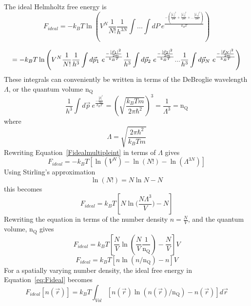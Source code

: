 \documentclass[double,12pt]{beavtex}
\begin{document}
The ideal Helmholtz free energy is
\begin{displaymath}{F_{ideal}=-k_BT\ln{\left(V^N\frac{1}{N!}\frac{1}{h^{3N}}\int{...}\int{dP}~e^\frac{-(\frac{|\vec{p}_1|^2}{2m}+ \frac{|\vec{p}_2|^2}{2m}+...\frac{|\vec{p}_N|^2}{2m})}{k_BT}\right)}}\end{displaymath}  

\begin{equation}{\label{Fidealmultipleint}}{=-k_BT\ln\left(V^N\frac{1}{N!}\frac{1}{h^{3}}\int{d\vec{p}_1}~e^\frac{-\frac{|\vec{p}_1|^2}{2m}}{k_BT}\frac{1}{h^{3}}\int{d\vec{p}_2}~e^\frac{-\frac{|\vec{p}_2|^2}{2m}}{k_BT}{...}\frac{1}{h^{3}}\int{d\vec{p}_N}~e^\frac{-\frac{|\vec{p}_N|^2}{2m}}{k_BT}\right)}\end{equation}
These integrals can conveniently be written in terms of the DeBroglie 
wavelength $\Lambda$, or the quantum volume $\text{n}_\text{Q}$
\begin{equation}{\frac{1}{h^{3}}\int{d\vec{p}}~e^\frac{-\frac{|\vec{p}|^2}{2m}}{k_BT}=\left(\sqrt{\frac{k_BTm}{2\pi\hbar^2}}\right)^3=\frac{1}{\Lambda^{3}}}=\text{n}_\text{Q}\end{equation} 
where \begin{equation}{\Lambda =\sqrt{\frac{2\pi\hbar^2}{k_BTm}}}\end{equation} 
Rewriting Equation~\ref{Fidealmultipleint} in terms of $\Lambda$ gives
\begin{equation}{F_{ideal}= -k_BT[\ln(V^N)-\ln(N!) - \ln(\Lambda^{3N})]}\end{equation}
Using Stirling's approximation \begin{equation}{\ln(N!)=N\ln{N}-N}\end{equation} 
this becomes
\begin{equation}{F_{ideal}= k_BT[N\ln(\frac{N\Lambda^{3}}{V}{)-N}]}\end{equation} 
Rewriting the equation in terms of the number density $n=\frac{N}{V}$, 
and the quantum volume, $\text{n}_\text{Q}$ gives
\begin{equation}{F_{ideal}= k_BT\left[\frac{N}{V}\ln{\left(\frac{N}{V}\frac{1}{\text{n}_\text{Q}}\right)}-\frac{N}{V}\right]}V\end{equation}
\begin{equation}\label{eq:Fideal}{F_{ideal}= k_BT[n\ln(n/\text{n}_\text{Q})-n]V}\end{equation}   
For a spatially varying number density, the ideal free energy in 
Equation~\ref{eq:Fideal} becomes
\begin{equation}\label{eq:Fideal-n(r)}{F_{ideal}[n(\vec{r})]= k_BT\int_{Vol}[n(\vec{r})\ln(n(\vec{r})/\text{n}_\text{Q})-n(\vec{r})]d\vec{r}}\end{equation} 
\end{document}
